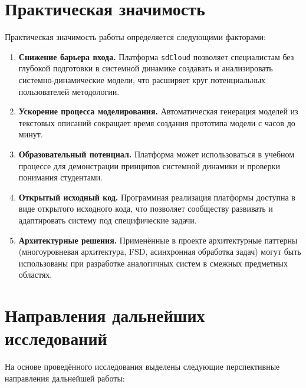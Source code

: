 \section*{Практическая значимость}

Практическая значимость работы определяется следующими факторами:

\begin{enumerate}
    \item \textbf{Снижение барьера входа.} Платформа \texttt{sdCloud} позволяет специалистам без глубокой подготовки в системной динамике создавать и анализировать системно-динамические модели, что расширяет круг потенциальных пользователей методологии.

    \item \textbf{Ускорение процесса моделирования.} Автоматическая генерация моделей из текстовых описаний сокращает время создания прототипа модели с часов до минут.

    \item \textbf{Образовательный потенциал.} Платформа может использоваться в учебном процессе для демонстрации принципов системной динамики и проверки понимания студентами.

    \item \textbf{Открытый исходный код.} Программная реализация платформы доступна в виде открытого исходного кода, что позволяет сообществу развивать и адаптировать систему под специфические задачи.

    \item \textbf{Архитектурные решения.} Применённые в проекте архитектурные паттерны (многоуровневая архитектура, FSD, асинхронная обработка задач) могут быть использованы при разработке аналогичных систем в смежных предметных областях.
\end{enumerate}

\section*{Направления дальнейших исследований}

На основе проведённого исследования выделены следующие перспективные направления дальнейшей работы:

